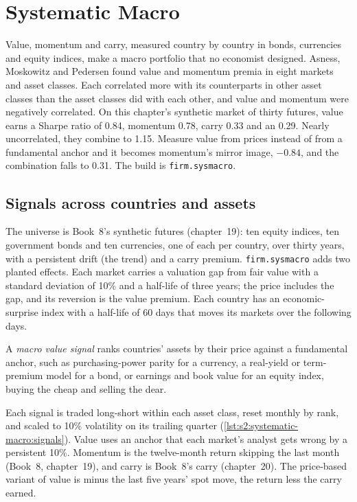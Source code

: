 \chapter{Systematic Macro}\label{ch:s2:systematic-macro}

Value, momentum and carry, measured country by country in bonds, currencies and equity indices, make a macro portfolio that no economist designed.
Asness, Moskowitz and Pedersen found value and momentum premia in eight markets and asset classes. Each correlated more with its counterparts in other
asset classes than the asset classes did with each other, and value and momentum were negatively correlated. On this chapter's synthetic market of
thirty futures, value earns a Sharpe ratio of 0.84, momentum 0.78, carry 0.33 and an  0.29. Nearly uncorrelated, they combine
to 1.15. Measure value from prices instead of from a fundamental anchor and it becomes momentum's mirror image, $-0.84$, and the combination falls to
0.31. The build is \texttt{firm.sysmacro}.

\section{Signals across countries and assets}

The universe is Book~8's synthetic futures (chapter~19): ten equity indices, ten government bonds and ten currencies, one of each per country, over
thirty years, with a persistent drift (the trend) and a carry premium. \texttt{firm.sysmacro} adds two planted effects. Each market carries a
valuation gap from fair value with a standard deviation of 10\% and a half-life of three years; the price includes the gap, and its reversion is the
value premium. Each country has an economic-surprise index with a half-life of 60 days that moves its markets over the following days.

\begin{definition}\label{def:s2:systematic-macro:value}
A \emph{macro value signal} ranks countries' assets by their price against a fundamental anchor, such as purchasing-power
parity for a currency, a real-yield or term-premium model for a bond, or earnings and book value for an equity index, buying the cheap and selling the
dear.
\end{definition}

Each signal is traded long-short within each asset class, reset monthly by rank, and scaled to 10\% volatility on its trailing quarter
(\cref{lst:s2:systematic-macro:signals}). Value uses an anchor that each market's analyst gets wrong by a persistent 10\%. Momentum is the
twelve-month return skipping the last month (Book~8, chapter~19), and carry is Book~8's carry (chapter~20). The price-based variant of value is minus
the last five years' spot move, the return less the carry earned.

